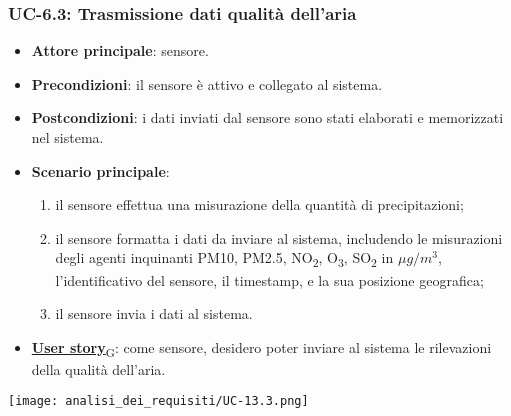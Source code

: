 \subsubsection{UC-6.3: Trasmissione dati qualità dell'aria}
\begin{itemize}
	\item \textbf{Attore principale}: sensore.
	\item \textbf{Precondizioni}: il sensore è attivo e collegato al sistema.
	\item \textbf{Postcondizioni}: i dati inviati dal sensore sono stati elaborati e memorizzati nel sistema.
	\item \textbf{Scenario principale}:
	      \begin{enumerate}
		      \item il sensore effettua una misurazione della quantità di precipitazioni;
		      \item il sensore formatta i dati da inviare al sistema, includendo le misurazioni degli agenti inquinanti PM10, PM2.5, NO\textsubscript{2}, O\textsubscript{3}, SO\textsubscript{2}
		            in $\mu g/m^3$, l'identificativo del sensore, il timestamp, e la sua posizione geografica;
		      \item il sensore invia i dati al sistema.
	      \end{enumerate}
	\item \href{https://7last.github.io/docs/pb/documentazione-interna/glossario\#user-story}{\textbf{User story}\textsubscript{G}}:
	      come sensore, desidero poter inviare al sistema le rilevazioni della qualità dell'aria.
\end{itemize}

\begin{center}
	\texttt{[image: analisi\_dei\_requisiti/UC-13.3.png]}
\end{center}

